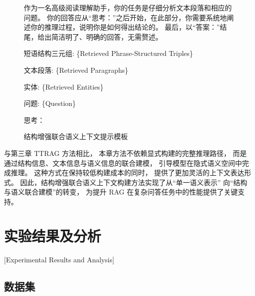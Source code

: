 \begin{figure}[htbp]
  \centering
  \begin{minipage}{0.95\linewidth}
      \vspace{2mm}
      \begin{tcolorbox}[title=结构增强联合语义上下文提示模板, fonttitle=\small, fontupper=\small]
  
          作为一名高级阅读理解助手，你的任务是仔细分析文本段落和相应的问题。
          你的回答应从“思考：”之后开始，在此部分，你需要系统地阐述你的推理过程，说明你是如何得出结论的。
          最后，以“答案：”结尾，给出简洁明了、明确的回答，无需赘述。
  
  \vspace{3pt}
  
  短语结构三元组: \{Retrieved Phrase-Structured Triples\}
  
  \vspace{3pt}
  
  文本段落: \{Retrieved Paragraphs\}
  
  \vspace{3pt}
  
  实体: \{Retrieved Entities\}
  
  \vspace{5pt}

  问题: \{Question\}
  
  \vspace{5pt}
  
  思考：
  
      \end{tcolorbox}
      \vspace{2mm}
  \end{minipage}
  \caption{结构增强联合语义上下文提示模板}
  \label{fig:js_prompt_template}
\end{figure}

与第三章 TTRAG 方法相比，
本章方法不依赖显式构建的完整推理路径，
而是通过结构信息、文本信息与语义信息的联合建模，
引导模型在隐式语义空间中完成推理。
这种方式在保持较低构建成本的同时，
提供了更加灵活的上下文表达形式。
因此，结构增强联合语义上下文构建方法实现了从“单一语义表示”
向“结构与语义联合建模”的转变，
为提升 RAG 在复杂问答任务中的性能提供了关键支持。

\section{实验结果及分析}[Experimental Results and Analysis]

\subsection{数据集}

